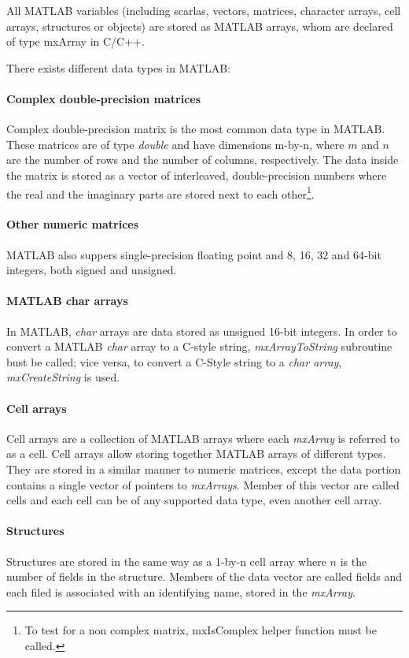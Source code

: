 \documentclass[12pt,a4paper]{extarticle}
\begin{document}
All MATLAB variables (including scarlas, vectors, matrices, character arrays, cell arrays, structures or objects) are stored as MATLAB arrays, whom are declared of type mxArray in C/C++.

There exists different data types in MATLAB:
\paragraph{Complex double-precision matrices}
Complex double-precision matrix is the most common data type in MATLAB. These matrices are of type \textit{double} and have dimensions m-by-n, where $m$ and $n$ are the number of rows and the number of columns, respectively. The data inside the matrix is stored as a vector of interleaved, double-precision numbers where the real and the imaginary parts are stored next to each other\footnote{To test for a non complex matrix, mxIsComplex helper function must be called.}.
\paragraph{Other numeric matrices}
MATLAB also suppers single-precision floating point and 8, 16, 32 and 64-bit integers, both signed and unsigned.
\paragraph{MATLAB char arrays}
In MATLAB, \textit{char} arrays are data stored as unsigned 16-bit integers. In order to convert a MATLAB \textit{char} array to a C-style string, \textit{mxArrayToString} subroutine bust be called; vice versa, to convert a C-Style string to a \textit{char array}, \textit{mxCreateString} is used.
\paragraph{Cell arrays}
Cell arrays are a collection of MATLAB arrays where each \textit{mxArray} is referred to as a cell. Cell arrays allow storing together MATLAB arrays of different types. They are stored in a similar manner to numeric matrices, except the data portion contains a single vector of pointers to \textit{mxArrays}. Member of this vector are called cells and each cell can be of any supported data type, even another cell array.
\paragraph{Structures}
Structures are stored in the same way as a 1-by-n cell array where $n$ is the number of fields in the structure. Members of the data vector are called fields and each filed is associated with an identifying name, stored in the \textit{mxArray}.
\end{document}
